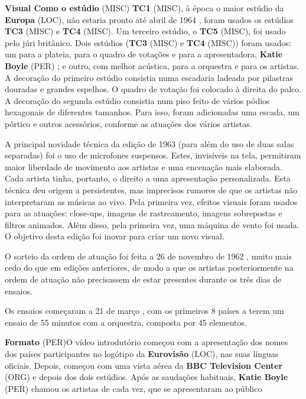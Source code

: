 \documentclass[12pt,a4paper]{article}
\begin{document}
\textbf{Visual Como o estúdio} (MISC) \textbf{TC1} (MISC), à época o maior estúdio da \textbf{Europa} (LOC), não estaria pronto até abril de 1964 , foram usados os estúdios \textbf{TC3} (MISC) e \textbf{TC4} (MISC). Um terceiro estúdio, o \textbf{TC5} (MISC), foi usado pelo júri britânico. Dois estúdios (\textbf{TC3} (MISC) e \textbf{TC4} (MISC)) foram usados: um para a plateia, para o quadro de votações e para a apresentadora, \textbf{Katie Boyle} (PER) ; e outro, com melhor acústica, para a orquestra e para os artistas. A decoração do primeiro estúdio consistia numa escadaria ladeada por pilastras douradas e grandes espelhos. O quadro de votação foi colocado à direita do palco. A decoração do segunda estúdio consistia num piso feito de vários pódios hexagonais de diferentes tamanhos. Para isso, foram adicionadas uma escada, um pórtico e outros acessórios, conforme as atuações dos vários artistas.

A principal novidade técnica da edição de 1963 (para além do uso de duas salas separadas) foi o uso de microfones suspensos. Estes, invisíveis na tela, permitiram maior liberdade de movimento aos artistas e uma encenação mais elaborada. Cada artista tinha, portanto, o direito a uma apresentação personalizada. Esta técnica deu origem a persistentes, mas imprecisos rumores de que os artistas não interpretaram as músicas ao vivo. Pela primeira vez, efeitos visuais foram usados para as atuações: close-ups, imagens de rastreamento, imagens sobrepostas e filtros animados. Além disso, pela primeira vez, uma máquina de vento foi usada. O objetivo desta edição foi inovar para criar um novo visual.

O sorteio da ordem de atuação foi feita a 26 de novembro de 1962 , muito mais cedo do que em edições anteriores, de modo a que os artistas posteriormente na ordem de atuação não precisassem de estar presentes durante os três dias de ensaios.

Os ensaios começaram a 21 de março , com os primeiros 8 países a terem um ensaio de 55 minutos com a orquestra, composta por 45 elementos.



\textbf{Formato} (PER)O vídeo introdutório começou com a apresentação dos nomes dos países participantes no logótipo da \textbf{Eurovisão} (LOC), nas suas línguas oficiais. Depois, começou com uma vista aérea da \textbf{BBC Television Center} (ORG) e depois dos dois estúdios. Após as saudações habituais, \textbf{Katie Boyle} (PER) chamou os artistas de cada vez, que se apresentaram ao público
\end{document}
